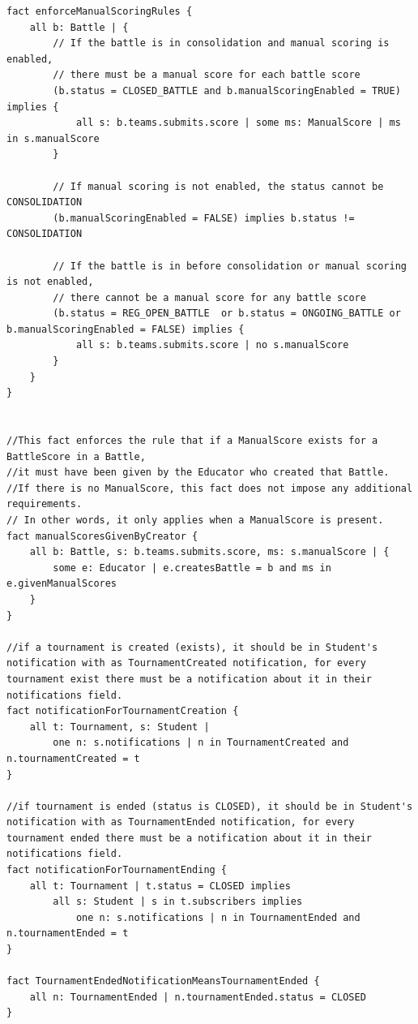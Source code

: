 \begin{lstlisting}[language=alloy]
fact enforceManualScoringRules {
    all b: Battle | {
        // If the battle is in consolidation and manual scoring is enabled,
        // there must be a manual score for each battle score
        (b.status = CLOSED_BATTLE and b.manualScoringEnabled = TRUE) implies {
            all s: b.teams.submits.score | some ms: ManualScore | ms in s.manualScore
        }
        
        // If manual scoring is not enabled, the status cannot be CONSOLIDATION
        (b.manualScoringEnabled = FALSE) implies b.status != CONSOLIDATION
        
        // If the battle is in before consolidation or manual scoring is not enabled,
        // there cannot be a manual score for any battle score
        (b.status = REG_OPEN_BATTLE  or b.status = ONGOING_BATTLE or b.manualScoringEnabled = FALSE) implies {
            all s: b.teams.submits.score | no s.manualScore
        }
    }
}


//This fact enforces the rule that if a ManualScore exists for a BattleScore in a Battle, 
//it must have been given by the Educator who created that Battle. 
//If there is no ManualScore, this fact does not impose any additional requirements.
// In other words, it only applies when a ManualScore is present.
fact manualScoresGivenByCreator {
    all b: Battle, s: b.teams.submits.score, ms: s.manualScore | {
        some e: Educator | e.createsBattle = b and ms in e.givenManualScores
    }
}

//if a tournament is created (exists), it should be in Student's notification with as TournamentCreated notification, for every tournament exist there must be a notification about it in their notifications field.
fact notificationForTournamentCreation {
    all t: Tournament, s: Student | 
        one n: s.notifications | n in TournamentCreated and n.tournamentCreated = t
}

//if tournament is ended (status is CLOSED), it should be in Student's notification with as TournamentEnded notification, for every tournament ended there must be a notification about it in their notifications field.
fact notificationForTournamentEnding {
    all t: Tournament | t.status = CLOSED implies 
        all s: Student | s in t.subscribers implies 
            one n: s.notifications | n in TournamentEnded and n.tournamentEnded = t
}

fact TournamentEndedNotificationMeansTournamentEnded {
    all n: TournamentEnded | n.tournamentEnded.status = CLOSED
}



\end{lstlisting}
